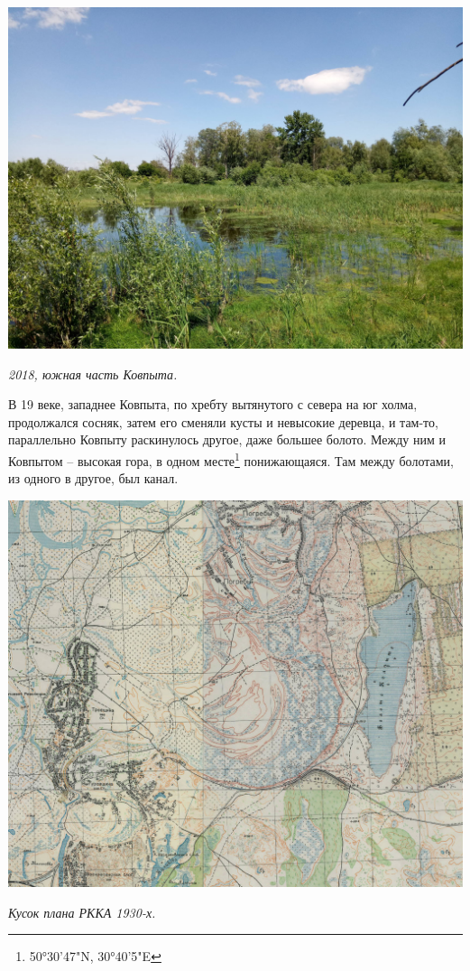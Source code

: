\begin{center}
\includegraphics[width=\linewidth]{chast-gorodki/kolpit/kov01-r.jpg}

\textit{2018, южная часть Ковпыта.}
\end{center}

В 19 веке, западнее Ковпыта, по хребту вытянутого с севера на юг холма, продолжался сосняк, затем его сменяли кусты и невысокие деревца, и там-то, параллельно Ковпыту раскинулось другое, даже большее болото. Между ним и Ковпытом – высокая гора, в одном месте\footnote{50°30'47"N, 30°40'5"E} понижающаяся. Там между болотами, из одного в другое, был канал.

\begin{center}
\includegraphics[width=\linewidth]{chast-gorodki/kolpit/rkka-kolp.jpg}

\textit{Кусок плана РККА 1930-х.}
\end{center}

